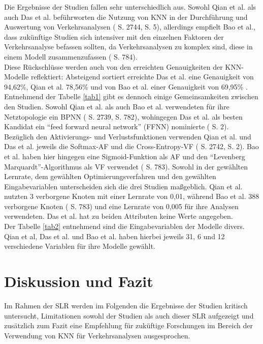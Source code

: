 \documentclass{scrartcl}
\begin{document}
Die Ergebnisse der Studien fallen sehr unterschiedlich aus. Sowohl Qian et al.
als auch Das et al. beführworten die Nutzung von KNN in der Durchführung
und Auswertung von Verkehrsanalysen (\cite{qian} S. 2744, \cite{das} S. 5),
allerdings empfielt Bao et al., dass zukünftige Studien sich intensiver mit
den einzelnen Faktoren der Verkehrsanalyse befassen sollten, da Verkehrsanalysen
zu komplex sind, diese in einem Modell zusammenzufassen (\cite{bao} S. 784).
\medskip \\
Diese Rückschlüsse werden auch von den erreichten Genauigkeiten der KNN-Modelle
reflektiert: Absteigend sortiert erreichte Das et al. eine Genauigkeit von 94,62\%, Qian et al. 78,56\%
und von Bao et al. einer Genauigkeit von 69,95\% \cite{das, qian, bao}.
\medskip \\
Entnehmend der Tabelle \ref{tab1} gibt es dennoch einige Gemeinsamkeiten
zwischen den Studien. Sowohl Qian et al. als auch Bao et al. verwendeten für
ihre Netztopologie ein BPNN
(\cite{qian} S. 2739, \cite{bao} S. 782), wohingegen Das et al. als besten Kandidat
ein \enquote{feed forward neural network} (FFNN) nominierte (\cite{das} S. 2).
Bezüglich den Aktivierungs- und Verlustsfunktionen verwenden Qian et al.
und Das et al. jeweils die Softmax-AF und die Cross-Entropy-VF
(\cite{qian} S. 2742, \cite{das} S. 2).
Bao et al. haben hier hingegen eine Sigmoid-Funktion als AF und den
\enquote{Levenberg Marquardt}-Algorithmus als VF verwendet (\cite{bao} S. 783).
Sowohl in der gewählten Lernrate, dem gewählten Optimierungsverfahren und den
gewählten Eingabevariablen unterscheiden sich die drei Studien maßgeblich.
Qian et al. nutzten 3 verborgene Knoten mit einer Lernrate von 0,01, während
Bao et al. 388 verborgene Knoten (\cite{bao} S. 783) und eine Lernrate von 0,005 
für ihre Analysen verwendeten. 
Das et al. hat zu beiden Attributen keine Werte angegeben.
\medskip \\
Der Tabelle \ref{tab2} entnehmend sind die Eingabevariablen der Modelle divers.
Qian et al, Das et al. und Bao et al. haben hierbei jeweils 31, 6 und 12 
verschiedene Variablen für ihre Modelle gewählt.

\section{Diskussion und Fazit}

Im Rahmen der SLR werden im Folgenden die Ergebnisse der Studien kritisch untersucht,
Limitationen sowohl der Studien als auch dieser SLR aufgezeigt und zusätzlich
zum Fazit eine Empfehlung für zuküftige Forschungen im Bereich der Verwendung
von KNN für Verkehrsanalysen ausgesprochen.
\end{document}
